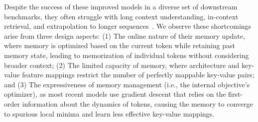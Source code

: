 Despite the success of these improved models in a diverse set of downstream benchmarks, they often struggle with long context understanding, in-context retrieval, and extrapolation to longer sequences~\citep{wen2024rnns, behrouz2024titans, arora2024simple, yang2024gated}. We observe these shortcomings arise from three design aspects: (1) The online nature of their memory update, where memory is optimized based on the current token while retaining past memory state, leading to memorization of individual tokens without considering broader context; (2) The limited capacity of memory, where architecture and key-value feature mappings restrict the number of perfectly mappable key-value pairs; and (3) The expressiveness of memory management (i.e., the internal objective's optimizer), as most recent models use gradient descent that relies on the first-order information about the dynamics of tokens, causing the memory to converge to spurious local minima and learn less effective key-value mappings.








